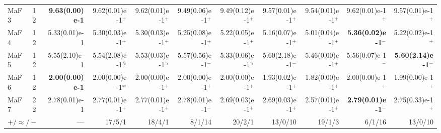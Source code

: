 \documentclass[pdflatex,sn-mathphys-ay]{sn-jnl}%
\theoremstyle{thmstyleone}%
\theoremstyle{thmstyletwo}%
\theoremstyle{thmstylethree}%
\begin{document}
\begin{landscape}
{\begin{longtable}{llrrrrrrrrr}
			MaF3                              & 12  & \textbf{9.63(0.00)e-1} & 9.62(0.01)e-1$^{+}$       & 9.62(0.01)e-1$^{+}$       & 9.49(0.06)e-1$^{+}$          & 9.49(0.12)e-1$^{+}$       & 9.57(0.01)e-1$^{+}$          & 9.54(0.01)e-1$^{+}$       & 9.62(0.01)e-1$^{+}$          & 9.57(0.01)e-1$^{+}$          \\
			MaF4                              & 12  & 5.33(0.01)e-1          & 5.30(0.03)e-1$^{+}$       & 5.30(0.03)e-1$^{+}$       & 5.25(0.08)e-1$^{+}$          & 5.22(0.05)e-1$^{+}$       & 5.16(0.07)e-1$^{+}$          & 5.01(0.04)e-1$^{+}$       & \textbf{5.36(0.02)e-1}$^{-}$ & 5.22(0.02)e-1$^{+}$          \\
			MaF5                              & 12  & 5.55(2.10)e-1          & 5.54(2.08)e-1$^{\approx}$ & 5.53(0.03)e-1$^{\approx}$ & 5.57(0.56)e-1$^{-}$          & 5.33(0.06)e-1$^{\approx}$ & 5.60(2.18)e-1$^{-}$          & 5.46(0.00)e-1$^{+}$       & 5.56(0.07)e-1$^{-}$          & \textbf{5.60(2.14)e-1}$^{-}$ \\
			MaF6                              & 12  & \textbf{2.00(0.00)e-1} & 2.00(0.00)e-1$^{\approx}$ & 2.00(0.00)e-1$^{+}$       & 2.00(0.00)e-1$^{+}$          & 2.00(0.00)e-1$^{+}$       & 1.93(0.02)e-1$^{+}$          & 1.82(0.00)e-1$^{+}$       & 2.00(0.00)e-1$^{+}$          & 1.99(0.00)e-1$^{+}$          \\
			MaF7                              & 22  & 2.78(0.01)e-1          & 2.77(0.01)e-1$^{+}$       & 2.77(0.01)e-1$^{+}$       & 2.78(0.01)e-1$^{-}$          & 2.69(0.03)e-1$^{+}$       & 2.69(0.03)e-1$^{+}$          & 2.57(0.01)e-1$^{+}$       & \textbf{2.79(0.01)e-1}$^{-}$ & 2.75(0.33)e-1$^{+}$          \\
			\midrule
			\multicolumn{2}{l}{$+/\approx/-$} & --- & 17/5/1                 & 18/4/1                    & 8/1/14                    & 20/2/1                       & 13/0/10                   & 19/1/3                       & 6/1/16                    & 13/0/10                                                     \\
		\end{longtable}
	}
\end{landscape}
\end{document}
